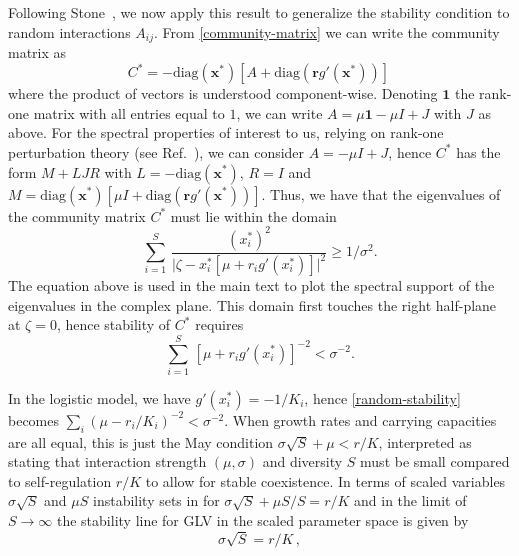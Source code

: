 \documentclass[10pt]{article}
\begin{document}
Following Stone~\cite{stoneFeasibility2018}, we now apply this result to generalize the stability condition to random interactions $A_{ij}$. From \eqref{community-matrix} we can write the community matrix as
\begin{equation}
    C^* = -\textrm{diag}(\mathbf x^*)[A + \textrm{diag}(\mathbf r  g'( \mathbf x^*))]\,
\end{equation}
where the product of vectors is understood component-wise. Denoting $\mathbf{1}$ the rank-one matrix with all entries equal to $1$, we can write $A = \mu \mathbf{1} - \mu I + J$ with $J$ as above. For the spectral properties of interest to us, relying on rank-one perturbation theory (see Ref.~\cite{stoneFeasibility2018}),
we can consider $A = - \mu I + J$, hence $C^*$ has the form $M + LJR$ with  
$L = -\textrm{diag}(\mathbf x^*)$, $R = I$ and $M = \textrm{diag}(\mathbf x^*)[\mu I + \textrm{diag}(\mathbf r g'(\mathbf x^*))]$. Thus, we have that the eigenvalues of the community matrix $C^*$ must lie within the domain 
\begin{equation}
    \sum_{i=1}^S\, \frac{(x_i^*)^2}{\vert \zeta -x_i^*[\mu + r_ig'(x_i^*)]\vert ^2}\geq 1/\sigma^2. 
    \label{eq: SM spectral domain}
\end{equation} 
The equation above is used in the main text to plot the spectral support of the eigenvalues in the complex plane.
This domain first touches the right half-plane at $\zeta = 0$, hence stability of $C^*$ requires   
\begin{equation}\label{random-stability}
    \sum_{i=1}^S\, [\mu + r_ig'(x_i^*)]^{-2}< \sigma^{-2}. 
\end{equation}

In the logistic model, we have $g'(x^*_i) = -1/K_i$, hence \eqref{random-stability} becomes $\sum_i (\mu - r_i/K_i)^{-2} < \sigma^{-2}$. When growth rates and carrying capacities are all equal, this is just the May condition $\sigma\sqrt{S} + \mu < r/K$, interpreted as stating that interaction strength $(\mu, \sigma)$ and diversity $S$ must be small compared to self-regulation $r/K$ to allow for stable coexistence.
In terms of scaled variables $\sigma\sqrt{S}$ and $\mu S$ instability
sets in for $\sigma\sqrt{S} + \mu S / S =  r/K$ and in the limit of
$S\to\infty$ the stability line for GLV in the scaled 
parameter space is given by 
\begin{equation}
    \sigma\sqrt{S} = r/K \, ,
\end{equation}
\end{document}
